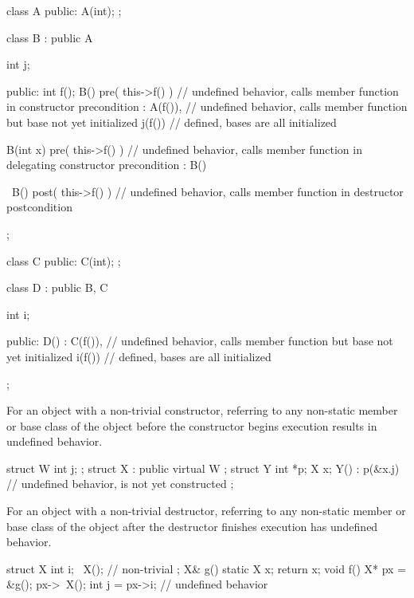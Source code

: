 \pnum
\begin{example}
\begin{codeblock}
class A {
public:
  A(int);
};

class B : public A {
  int j;

public:
  int f();
  B()
      pre( this->f() )  // undefined behavior, calls member function in constructor precondition
      : A(f()),         // undefined behavior, calls member function but base  not yet initialized
        j(f()) {}       // defined, bases are all initialized

  B(int x)
      pre( this->f() )  // undefined behavior, calls member function in delegating constructor precondition
      : B() {}

  ~B()
      post( this->f() ) // undefined behavior, calls member function in destructor postcondition
      {}
};

class C {
public:
  C(int);
};

class D : public B, C {
  int i;

public:
  D()
      : C(f()),         // undefined behavior, calls member function but base  not yet initialized
        i(f()) {}       // defined, bases are all initialized
};
\end{codeblock}
\end{example}


\pnum
For an object with a non-trivial constructor,
referring to any non-static member or base class of the object
before the constructor begins execution results in undefined behavior.

\pnum
\begin{example}
\begin{codeblock}
struct W {
  int j;
};
struct X : public virtual W {};
struct Y {
  int *p;
  X x;
  Y() : p(&x.j) {       // undefined behavior,  is not yet constructed
  }
};
\end{codeblock}
\end{example}


\pnum
For an object with a non-trivial destructor,
referring to any non-static member or base class of the object
after the destructor finishes execution
has undefined behavior.

\pnum
\begin{example}
\begin{codeblock}
struct X {
  int i;
  ~X();     // non-trivial
};
X& g()
{
  static X x;
  return x;
}
void f()
{
  X* px = &g();
  px->~X();
  int j = px->i;    // undefined behavior
}
\end{codeblock}
\end{example}

